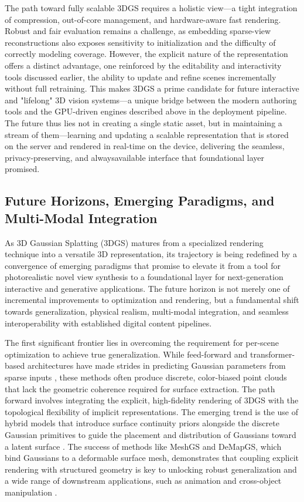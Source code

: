 \documentclass[11pt,a4paper]{article}
\begin{document}
The path toward fully scalable 3DGS requires a holistic view---a tight integration of compression, out-of-core management, and hardware-aware fast rendering. Robust and fair evaluation remains a challenge, as embedding sparse-view reconstructions also exposes sensitivity to initialization and the difficulty of correctly modeling coverage. However, the explicit nature of the representation offers a distinct advantage, one reinforced by the editability and interactivity tools discussed earlier, the ability to update and refine scenes incrementally without full retraining. This makes 3DGS a prime candidate for future interactive and "lifelong" 3D vision systems---a unique bridge between the modern authoring tools and the GPU-driven engines described above in the deployment pipeline. The future thus lies not in creating a single static asset, but in maintaining a stream of them---learning and updating a scalable representation that is stored on the server and rendered in real-time on the device, delivering the seamless, privacy-preserving, and alwaysavailable interface that foundational layer promised.


\subsection{Future Horizons, Emerging Paradigms, and Multi-Modal Integration}


As 3D Gaussian Splatting (3DGS) matures from a specialized rendering technique into a versatile 3D representation, its trajectory is being redefined by a convergence of emerging paradigms that promise to elevate it from a tool for photorealistic novel view synthesis to a foundational layer for next-generation interactive and generative applications. The future horizon is not merely one of incremental improvements to optimization and rendering, but a fundamental shift towards generalization, physical realism, multi-modal integration, and seamless interoperability with established digital content pipelines.

The first significant frontier lies in overcoming the requirement for per-scene optimization to achieve true generalization. While feed-forward and transformer-based architectures have made strides in predicting Gaussian parameters from sparse inputs \cite{arxiv:2602.02000v2}, these methods often produce discrete, color-biased point clouds that lack the geometric coherence required for surface extraction. The path forward involves integrating the explicit, high-fidelity rendering of 3DGS with the topological flexibility of implicit representations. The emerging trend is the use of hybrid models that introduce surface continuity priors alongside the discrete Gaussian primitives to guide the placement and distribution of Gaussians toward a latent surface \cite{arxiv:2411.16898v4}. The success of methods like MeshGS and DeMapGS, which bind Gaussians to a deformable surface mesh, demonstrates that coupling explicit rendering with structured geometry is key to unlocking robust generalization and a wide range of downstream applications, such as animation and cross-object manipulation \cite{arxiv:2410.08941v1,arxiv:2512.10572v1}.
\end{document}
